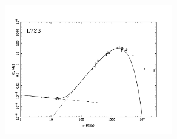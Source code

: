 \documentclass[9pt]{extarticle}   	%
\begin{document}
\begin{figure}[htbp]
\begin{center}
\includegraphics[width=0.65\textwidth]{plots/L723.pdf}
\label{default}
\end{center}
\end{figure}

\clearpage
\end{document}
